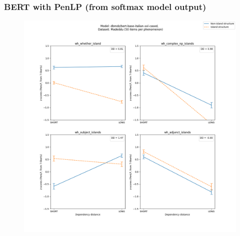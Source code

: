 \subsubsection{BERT with PenLP (from softmax model output)}
\begin{figure}[h]
	\centering
	\includegraphics[width=1\textwidth]{images/Chapter1/Madeddu_wh_dbmdz_bert-base-italian-xxl-cased_PenLP-zscores-likert-2022-07-11.png} 
\end{figure}

\clearpage
